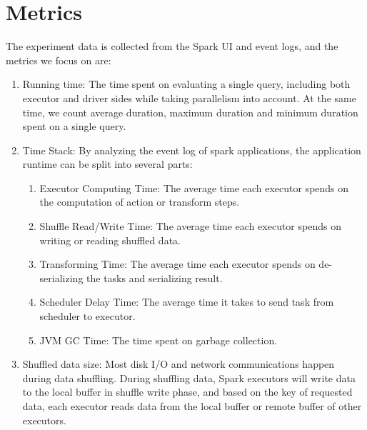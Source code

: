 \section{Metrics}
The experiment data is collected from the Spark UI and event logs, and the metrics we focus on are:
\begin{enumerate}
    \item Running time: The time spent on evaluating a single query, including both executor and driver sides while taking parallelism into account. At the same time, we count average duration, maximum duration and minimum duration spent on a single query.
    \item Time Stack: By analyzing the event log of spark applications, the application runtime can be split into several parts:
        \begin{enumerate}
        \item Executor Computing Time: The average time each executor spends on the computation of action or transform steps.
        \item Shuffle Read/Write Time: The average time each executor spends on writing or reading shuffled data.
        \item Transforming Time: The average time each executor spends on de-serializing the tasks and serializing result.
        \item Scheduler Delay Time: The average time it takes to send task from scheduler to executor.
        \item JVM GC Time: The time spent on garbage collection.
        \end{enumerate}
    \item Shuffled data size: Most disk I/O and network communications happen during data shuffling. During shuffling data, Spark executors will write data to the local buffer in shuffle write phase, and based on the key of requested data, each executor reads data from the local buffer or remote buffer of other executors. 
\end{enumerate}
